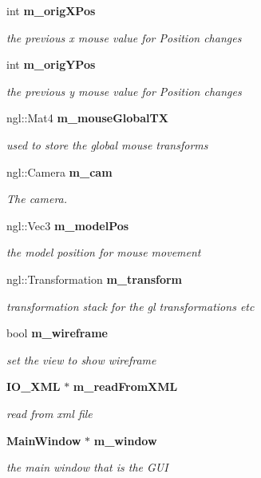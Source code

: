 \begin{DoxyCompactItemize}
int {\bf m\-\_\-orig\-X\-Pos}
\begin{DoxyCompactList}\small\item\em the previous x mouse value for Position changes \end{DoxyCompactList}\item 
int {\bf m\-\_\-orig\-Y\-Pos}
\begin{DoxyCompactList}\small\item\em the previous y mouse value for Position changes \end{DoxyCompactList}\item 
ngl\-::\-Mat4 {\bf m\-\_\-mouse\-Global\-T\-X}
\begin{DoxyCompactList}\small\item\em used to store the global mouse transforms \end{DoxyCompactList}\item 
ngl\-::\-Camera {\bf m\-\_\-cam}
\begin{DoxyCompactList}\small\item\em The camera. \end{DoxyCompactList}\item 
ngl\-::\-Vec3 {\bf m\-\_\-model\-Pos}
\begin{DoxyCompactList}\small\item\em the model position for mouse movement \end{DoxyCompactList}\item 
ngl\-::\-Transformation {\bf m\-\_\-transform}
\begin{DoxyCompactList}\small\item\em transformation stack for the gl transformations etc \end{DoxyCompactList}\item 
bool {\bf m\-\_\-wireframe}
\begin{DoxyCompactList}\small\item\em set the view to show wireframe \end{DoxyCompactList}\item 
{\bf I\-O\-\_\-\-X\-M\-L} $\ast$ {\bf m\-\_\-read\-From\-X\-M\-L}
\begin{DoxyCompactList}\small\item\em read from xml file \end{DoxyCompactList}\item 
{\bf Main\-Window} $\ast$ {\bf m\-\_\-window}
\begin{DoxyCompactList}\small\item\em the main window that is the G\-U\-I \end{DoxyCompactList}\item 

\end{DoxyCompactItemize}
